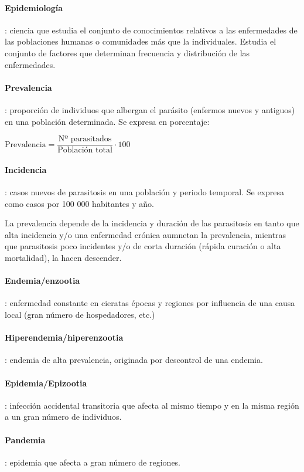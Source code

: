 \paragraph{Epidemiología}: ciencia que estudia el conjunto de conocimientos relativos a las enfermedades de las poblaciones humanas o comunidades más que la individuales. Estudia el conjunto de factores que determinan frecuencia y distribución de las enfermedades.
\paragraph{Prevalencia}: proporción de individuos que albergan el parásito (enfermos nuevos y antiguos) en una población determinada. Se expresa en porcentaje:
\begin{center}
	\begin{math}
		\mbox{Prevalencia} = \dfrac{\mbox{Nº parasitados}}{\mbox{Población total}} \cdot 100
	\end{math}
\end{center}
\paragraph{Incidencia}: casos nuevos de parasitosis en una población y periodo temporal. Se expresa como casos por 100 000 habitantes y año.

La prevalencia depende de la incidencia y duración de las parasitosis en tanto que alta incidencia y/o una enfermedad crónica aumnetan la prevalencia, mientras que parasitosis poco incidentes y/o de corta duración (rápida curación o alta mortalidad), la hacen descender.

\paragraph{Endemia/enzootia}: enfermedad constante en cieratas épocas y regiones por influencia de una causa local (gran número de hospedadores, etc.)
\paragraph{Hiperendemia/hiperenzootia}: endemia de alta prevalencia, originada por descontrol de una endemia.
\paragraph{Epidemia/Epizootia}: infección accidental transitoria que afecta al mismo tiempo y en la misma región a un gran número de individuos.
\paragraph{Pandemia}: epidemia que afecta a gran número de regiones.
